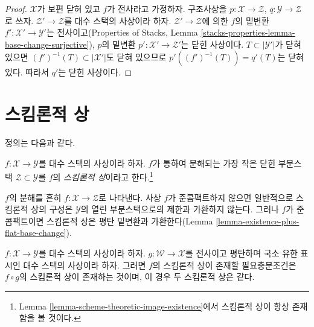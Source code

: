 \begin{proof}
$\mathcal{X}$가 보편 닫혀 있고 $f$가 전사라고 가정하자. 구조사상을
$p : \mathcal{X} \to \mathcal{Z}$,
$q : \mathcal{Y} \to \mathcal{Z}$로 쓰자.
$\mathcal{Z}' \to \mathcal{Z}$를 대수 스택의 사상이라 하자.
$\mathcal{Z}' \to \mathcal{Z}$에 의한 $f$의 밑변환
$f' : \mathcal{X}' \to \mathcal{Y}'$는 전사이고(Properties of Stacks,
Lemma \ref{stacks-properties-lemma-base-change-surjective}), $p$의 밑변환
$p' : \mathcal{X}' \to \mathcal{Z}'$는 닫힌 사상이다.
$T \subset |\mathcal{Y}'|$가 닫혀 있으면
$(f')^{-1}(T) \subset |\mathcal{X}'|$도 닫혀 있으므로
$p'((f')^{-1}(T)) = q'(T)$는 닫혀 있다. 따라서 $q'$는 닫힌 사상이다.
\end{proof}








\section{스킴론적 상}
\label{section-scheme-theoretic-image}

\noindent
정의는 다음과 같다.

\begin{definition}
\label{definition-scheme-theoretic-image}
$f : \mathcal{X} \to \mathcal{Y}$를 대수 스택의 사상이라 하자. $f$가
통하여 분해되는 가장 작은 닫힌 부분스택
$\mathcal{Z} \subset \mathcal{Y}$를 $f$의 {\it 스킴론적 상}이라고
한다.\footnote{Lemma \ref{lemma-scheme-theoretic-image-existence}에서
스킴론적 상이 항상 존재함을 볼 것이다.}
\end{definition}

\noindent
$f$의 분해를 흔히 $f : \mathcal{X} \to \mathcal{Z}$로 나타낸다. 사상
$f$가 준콤팩트하지 않으면 일반적으로 스킴론적 상의 구성은
$\mathcal{Y}$의 열린 부분스택으로의 제한과 가환하지 않는다. 그러나
$f$가 준콤팩트이면 스킴론적 상은 평탄 밑변환과 가환한다(Lemma
\ref{lemma-existence-plus-flat-base-change}).

\begin{lemma}
\label{lemma-cover-upstairs}
$f : \mathcal{X} \to \mathcal{Y}$를 대수 스택의 사상이라 하자.
$g : \mathcal{W} \to \mathcal{X}$를 전사이고 평탄하며 국소 유한 표시인
대수 스택의 사상이라 하자. 그러면 $f$의 스킴론적 상이 존재할
필요충분조건은 $f \circ g$의 스킴론적 상이 존재하는 것이며, 이 경우 두
스킴론적 상은 같다.
\end{lemma}

